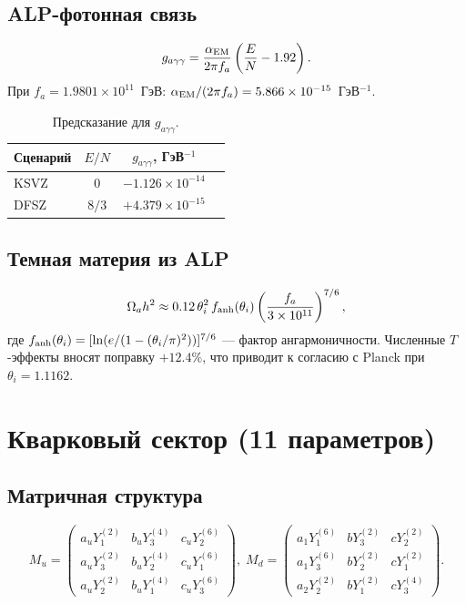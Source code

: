 \documentclass[12pt,a4paper]{article}
\numberwithin{equation}{section}
\begin{document}
\subsection{ALP-фотонная связь}
\begin{equation}
g_{a\gamma\gamma} = \frac{\alpha_{\rm EM}}{2\pi f_a}\left(\frac{E}{N} - 1.92\right).
\end{equation}
При $f_a = 1.9801\times10^{11}$~ГэВ: $\alpha_{\rm EM}/(2\pi f_a) = 5.866\times10^{-15}$~ГэВ$^{-1}$.
\begin{table}[H]
\centering
\caption{Предсказание для $g_{a\gamma\gamma}$.}
\begin{tabular}{lccc}
\toprule
Сценарий & $E/N$ & $g_{a\gamma\gamma}$, ГэВ$^{-1}$ \\
\midrule
KSVZ & $0$   & $-1.126\times10^{-14}$ \\
DFSZ & $8/3$ & $+4.379\times10^{-15}$ \\
\bottomrule
\end{tabular}
\end{table}

\subsection{Темная материя из ALP}
\begin{equation}
\Omega_a h^2 \approx 0.12\,\theta_i^2\, f_{\rm anh}(\theta_i)
\left(\frac{f_a}{3\times10^{11}}\right)^{7/6},
\end{equation}
где $f_{\rm anh}(\theta_i) = [\ln(e/(1-(\theta_i/\pi)^2))]^{7/6}$ --- фактор ангармоничности. Численные $T$-эффекты вносят поправку $+12.4\%$, что приводит к согласию с Planck при $\theta_i = 1.1162$.

\section{Кварковый сектор (11 параметров)}
\subsection{Матричная структура}
\begin{equation}
M_u = \begin{pmatrix}
a_u Y_1^{(2)} & b_u Y_3^{(4)} & c_u Y_2^{(6)} \\
a_u Y_3^{(2)} & b_u Y_2^{(4)} & c_u Y_1^{(6)} \\
a_u Y_2^{(2)} & b_u Y_1^{(4)} & c_u Y_3^{(6)}
\end{pmatrix}, \;
M_d = \begin{pmatrix}
a_1 Y_1^{(6)} & b Y_3^{(2)} & c Y_2^{(2)} \\
a_1 Y_3^{(6)} & b Y_2^{(2)} & c Y_1^{(2)} \\
a_2 Y_2^{(2)} & b Y_1^{(2)} & c Y_3^{(4)}
\end{pmatrix}.
\end{equation}
\end{document}
